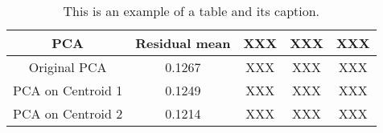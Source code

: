 \begin{table}[!ht]
\renewcommand{\arraystretch}{1.50}
\caption[Table]{This is an example of a table and its caption.}
\label{tablePCA}
\centering
\begin{tabular}{| c | c | c | c | c |}
\hline
\bfseries PCA & \bfseries Residual mean & \bfseries XXX & \bfseries XXX & \bfseries XXX \\
\hline\hline
Original PCA & 0.1267 & XXX & XXX & XXX  \\
\hline
PCA on Centroid 1 & 0.1249 & XXX & XXX  & XXX\\
\hline
PCA on Centroid 2 & 0.1214  & XXX & XXX  & XXX\\
\hline
\end{tabular}
\end{table}

\newpage


